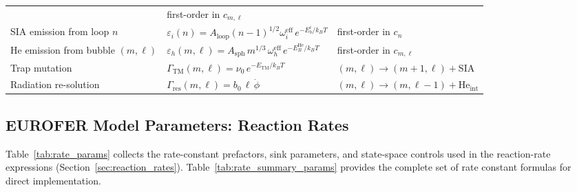 \documentclass[pdflatex,sn-basic]{sn-jnl} %
\begin{document}
\begin{table}[htbp]
\begin{tabular}{@{}lll@{}}
  & first-order in $c_{m,\ell}$ \\[3pt]
SIA emission from loop $n$
  & $\varepsilon_i(n)=A_{\mathrm{loop}}(n-1)^{1/2}\omega_i^{\mathrm{eff}}\,e^{-E_b^i/k_BT}$
  & first-order in $c_n$ \\[3pt]
He emission from bubble $(m,\ell)$
  & $\varepsilon_h(m,\ell)=A_{\mathrm{sph}}\,m^{1/3}\,\omega_h^{\mathrm{eff}}\,e^{-E_B^{\mathrm{He}}/k_BT}$
  & first-order in $c_{m,\ell}$ \\[3pt]
Trap mutation
  & $\Gamma_{\mathrm{TM}}(m,\ell)=\nu_0\,e^{-E_{\mathrm{TM}}/k_BT}$
  & $(m,\ell) \to (m{+}1,\ell) + \mathrm{SIA}$ \\[3pt]
Radiation re-solution
  & $\Gamma_{\mathrm{res}}(m,\ell) = b_0\,\ell\,\dot{\phi}$
  & $(m,\ell) \to (m,\ell{-}1) + \mathrm{He}_{\mathrm{int}}$ \\
\bottomrule
\end{tabular}
\end{table}

\subsection{EUROFER Model Parameters: Reaction Rates}
\label{sec:params_reactions}

Table~\ref{tab:rate_params} collects the rate-constant prefactors, sink
parameters, and state-space controls used in the reaction-rate expressions
(Section~\ref{sec:reaction_rates}). Table~\ref{tab:rate_summary_params}
provides the complete set of rate constant formulas for direct implementation.
\end{document}
